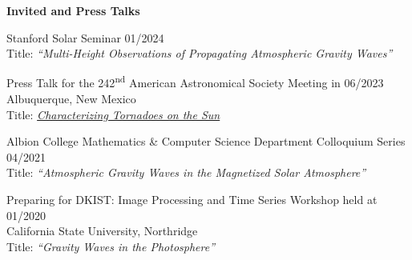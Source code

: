 \documentclass{resume} %
\begin{document}
\vspace{-0.1in}
\begin{rSection}{\textbf{Invited and Press Talks}}
\vspace{0.02in}

{Stanford Solar Seminar \hfill{01/2024} \\
Title: \emph{``Multi-Height Observations of Propagating Atmospheric Gravity Waves''}}

{Press Talk for the 242\textsuperscript{nd} American Astronomical Society Meeting in \hfill{06/2023} \\ Albuquerque, New Mexico} \\
Title: \href{https://aas.org/sites/default/files/2023-06/AAS242_Mon2_OanaVesa.pdf}{\emph{Characterizing Tornadoes on the Sun}}

{Albion College Mathematics \& Computer Science Department Colloquium Series \hfill{04/2021} \\
Title: \emph{``Atmospheric Gravity Waves in the Magnetized Solar Atmosphere''}}

{Preparing for DKIST: Image Processing and Time Series Workshop held at \hfill{01/2020} \\  California State University, Northridge  \\
Title: \emph{``Gravity Waves in the Photosphere''}}
\end{rSection}
\end{document}

